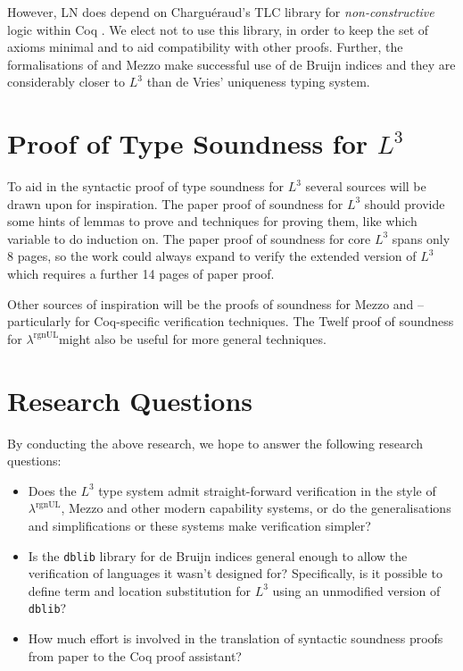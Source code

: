 \documentclass[]{unswthesis}
\newcommand{\rgnUL}{$\lambda^\text{rgnUL}$\text{ }}
\newcommand{\SSPHS}{\text{SSPHS }}
\let\c\texttt
\begin{document}
However, LN does depend on Chargu\'{e}raud's TLC library for \textit{non-constructive} logic within Coq \cite{tlc15}. We elect not to use this library, in order to keep the set of axioms minimal and to aid compatibility with other proofs. Further, the formalisations of \SSPHS and Mezzo make successful use of de Bruijn indices and they are considerably closer to $L^3$ than de Vries' uniqueness typing system.

\section{Proof of Type Soundness for $L^3$}
\label{sec:proof_proposal}

To aid in the syntactic proof of type soundness for $L^3$ several sources will be drawn upon for inspiration. The paper proof of soundness for $L^3$ should provide some hints of lemmas to prove and techniques for proving them, like which variable to do induction on. The paper proof of soundness for core $L^3$ spans only 8 pages, so the work could always expand to verify the extended version of $L^3$ which requires a further 14 pages of paper proof.

Other sources of inspiration will be the proofs of soundness for Mezzo and \SSPHS -- particularly for Coq-specific verification techniques. The Twelf proof of soundness for \rgnUL might also be useful for more general techniques.

\section{Research Questions}
\label{sec:research_questions}

By conducting the above research, we hope to answer the following research questions:

\begin{itemize}
\item Does the $L^3$ type system admit straight-forward verification in the style of \rgnUL, Mezzo and other modern capability systems, or do the generalisations and simplifications or these systems make verification simpler?
\item Is the \c{dblib} library for de Bruijn indices general enough to allow the verification of languages it wasn't designed for? Specifically, is it possible to define term and location substitution for $L^3$ using an unmodified version of \c{dblib}?
\item How much effort is involved in the translation of syntactic soundness proofs from paper to the Coq proof assistant?
\end{itemize}
\end{document}
